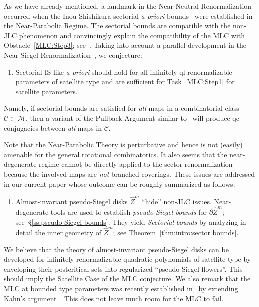 \documentclass{amsart}
\makeatletter
\newcommand{\1}{{\mathbb 1 }}
\newcommand{\setword}[2]{%
  \phantomsection
  #1\def\@currentlabel{\unexpanded{#1}}\label{#2}%
}
\newcommand\MM{\mathcal{M}}
\newcommand{\wZ}{{\widehat Z}}
\theoremstyle{remark}
\numberwithin{equation}{section}
\theoremstyle{definition}
\newcommand{\CC}{{\mathcal C}}
\makeatother
\begin{document}
 As we have already mentioned, a landmark in the Near-Neutral Renormalization occurred when the Inou-Shishikura sectorial \emph{a priori} bounds~\cite{IS} were established in the Near-Parabolic Regime. The sectorial bounds are compatible with the non-JLC phenomenon and convincingly explain the compatibility of the MLC with Obstacle~\ref{MLC:Step3}; see~\cite{CS,Ch3}. Taking into account a parallel development in the Near-Siegel Renormalization~\cite{DLS, DL}, we conjecture:
 
  \begin{enumerate}[label=\text{(\Roman*)},font=\normalfont,leftmargin=*,start=4]
\item \label{MLC:Step4} Sectorial IS-like \emph{a priori} should hold for all infinitely ql-renormalizable parameters of satellite type and are sufficient for Task~\ref{MLC:Step1} for satellite parameters.
\end{enumerate}
Namely, if sectorial bounds are satisfied for \emph{all} maps in a combinatorial class $\CC\subset \MM$, then a variant of the Pullback Argument similar to~\cite[Corollary 4.7]{DLS} will produce qc conjugacies between \emph{all} maps in $\CC$.

 
  

 Note that the Near-Parabolic Theory is perturbative and hence is not (easily) amenable for the general rotational combinatorics. It also seems that the near-degenerate regime cannot be directly applied to the sector renormalization because the involved maps are \emph{not} branched coverings. 
These issues are addressed in  our current paper whose outcome can be roughly summarized as follows:

\begin{enumerate}
\item[\setword{$\big(\wZ\big)$}{Item:wZ}] Almost-invariant pseudo-Siegel disks $\wZ^m$ ``hide'' non-JLC issues. Near-degenerate tools are used to establish {\em pseudo-Siegel bounds}  for $\partial \wZ^m$; see~\S\ref{ss:pseudo-Siegel bounds}. They  yield {\em Sectorial bounds} by analyzing in detail the inner geometry of $\wZ^m$; see Theorem~\ref{thm:intro:sector bounds}.
\end{enumerate}
We believe that the theory of almost-invariant pseudo-Siegel disks can be developed for infinitely renormalizable quadratic polynomials of satellite type by enveloping their postcritical sets into  regularized ``pseudo-Siegel flowers''. This should imply the Satellite Case of the MLC conjecture. We also remark that the MLC at bounded type parameters was recently established in~\cite{DL:Feigen} by extending Kahn's argument~\cite{K}. This does not leave much room for the MLC to fail.
\end{document}
